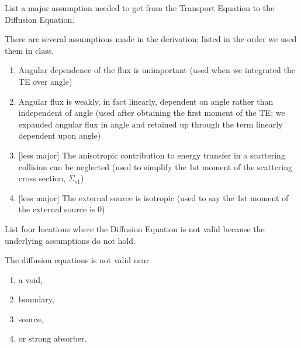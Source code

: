 \documentclass[12pt, answers]{exam}
\newcommand{\Macro}{\ensuremath{\Sigma}}
\begin{document}
\begin{questions}
\begin{solution}
\end{solution}

\vspace*{2em}
\addpoints
\question[5] List a major assumption needed to get from the Transport Equation to the Diffusion Equation.

\begin{solution}
There are several assumptions made in the derivation; listed in the order we used them in class.
%
\begin{enumerate}
\item Angular dependence of the flux is unimportant (used when we integrated the TE over angle)

\item Angular flux is weakly, in fact linearly, dependent on angle rather than independent of angle (used after obtaining the first moment of the TE; we expanded angular flux in angle and retained up through the term linearly dependent upon angle)

\item $[$less major$]$ The anisotropic contribution to energy transfer in a scattering collision can be neglected (used to simplify the 1st moment of the scattering cross section, $\Macro_{s1}$)

\item $[$less major$]$ The external source is isotropic (used to say the 1st moment of the external source is 0)

\end{enumerate}
%
\end{solution}


\vspace*{2em}
\addpoints
\question[5] List four locations where the Diffusion Equation is not valid because the underlying assumptions do not hold.

\begin{solution}
The diffusion equations is not valid near
%
\begin{enumerate}
\item a void, 
\item boundary, 
\item source, 
\item or strong absorber.
\end{enumerate} 
%
\end{solution}

\end{questions}
\end{document}
